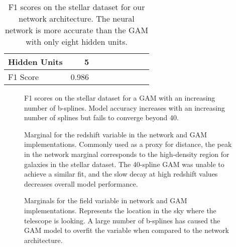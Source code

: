 \begin{table}[h]
    \centering
    \begin{tabular}{lrrrrrrrr}
        \toprule
        Hidden Units & 5 \\
        \midrule
        F1 Score & 0.986  \\
        \bottomrule
    \end{tabular}
\caption{F1 scores on the stellar dataset for our network architecture. The neural network is more accurate than the GAM with only eight hidden units.}
\end{table}


\begin{figure}
    \centering
    
    \caption{F1 scores on the stellar dataset for a GAM with an increasing number of b-splines. Model accuracy increases with an increasing number of splines but fails to converge beyond 40.}
    \centering
    \label{fig:gam_spline_f1}
\end{figure}


\begin{figure}
    \centering
    \begin{subfigure}{.5\textwidth}
      \centering
      
    \end{subfigure}%
    \begin{subfigure}{.5\textwidth}
      \centering
      
    \end{subfigure}
    \caption{Marginal for the redshift variable in the network and GAM implementations. Commonly used as a proxy for distance, the peak in the network marginal corresponds to the high-density region for galaxies in the stellar dataset. The 40-spline GAM was unable to achieve a similar fit, and the slow decay at high redshift values decreases overall model performance.}
    \label{fig:redshift}
\end{figure}


\begin{figure}
    \centering
    \begin{subfigure}{.5\textwidth}
      \centering
      
    \end{subfigure}%
    \begin{subfigure}{.5\textwidth}
      \centering
      
    \end{subfigure}
    \caption{Marginals for the field variable in network and GAM implementations. Represents the location in the sky where the telescope is looking. A large number of b-splines has caused the GAM model to overfit the variable when compared to the network architecture.}
    \label{fig:field}
\end{figure}


